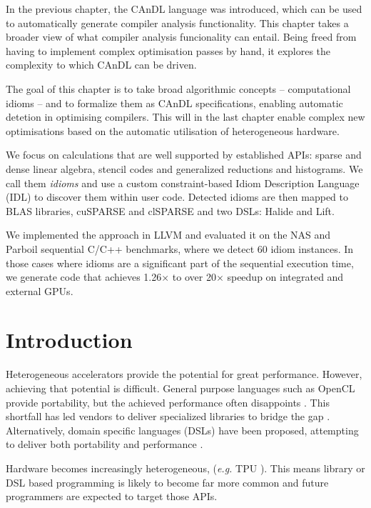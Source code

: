 
    In the previous chapter, the CAnDL language was introduced, which can be
    used to automatically generate compiler analysis functionality.
    This chapter takes a broader view of what compiler analysis funcionality
    can entail.
    Being freed from having to implement complex optimisation passes by hand, it
    explores the complexity to which CAnDL can be driven.

    The goal of this chapter is to take broad algorithmic concepts --
    computational idioms -- and to formalize them as CAnDL specifications,
    enabling automatic detetion in optimising compilers.
    This will in the last chapter enable complex new optimisations based on the
    automatic utilisation of heterogeneous hardware.

    We focus on calculations that are well supported by established APIs: sparse
    and dense linear algebra, stencil codes and generalized reductions and
    histograms.
    We call them {\em idioms} and use a custom constraint-based Idiom
    Description Language (IDL) to discover them within user code.
    Detected idioms are then mapped to BLAS libraries, cuSPARSE and clSPARSE and
    two DSLs: Halide and Lift.

    We implemented the approach in LLVM and evaluated it on the NAS and Parboil
    sequential C/C++ benchmarks, where we detect 60 idiom instances.
    In those cases where idioms are a significant part of the sequential
    execution time, we generate code that achieves 1.26$\times$ to over
    20$\times$ speedup on integrated and external GPUs.

\section{Introduction}

    Heterogeneous accelerators provide the potential for great performance.
    However, achieving that potential is difficult.
    General purpose languages such as OpenCL \cite{nvidia11guide} provide
    portability, but the achieved performance often disappoints
    \cite{lee09openmp}.
    This shortfall has led vendors to deliver specialized libraries to bridge
    the gap \cite{clblas}.  Alternatively, domain specific languages (DSLs)
    \cite{Franchetti09OL,Rompf:2012:LMS:2184319.2184345} have been proposed,
    attempting to deliver  both portability and performance
    \cite{Ragan-Kelley2013Halide}.

    Hardware becomes increasingly heterogeneous, ({\it e.g.} TPU
    \cite{jouppi2017datacenter}).
    This means library or DSL based programming is likely to become far more
    common and future programmers are expected to target those APIs.

